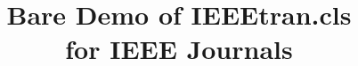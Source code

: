 \documentclass[journal]{IEEEtran}
\begin{document}
%
\title{Bare Demo of IEEEtran.cls\\ for IEEE Journals}
%
%
%


% 
%
\end{document}
